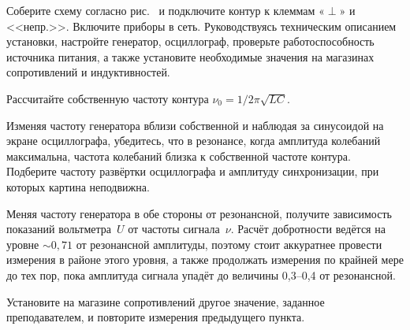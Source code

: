 \begin{lab:task}

    

	\item Соберите схему согласно рис.~
	и подключите контур к клеммам «$\perp$» и <<непр.>>. Включите приборы в сеть. 
    Руководствуясь техническим описанием установки, настройте генератор, 
    осциллограф, проверьте работоспособность источника питания, 
    а также установите необходимые значения на магазинах сопротивлений 
    и индуктивностей.


	\item Рассчитайте собственную частоту контура $\nu_{0} = 1/2\pi\sqrt{LC}$.

	\item Изменяя частоту генератора вблизи собственной и наблюдая за синусоидой 
    на экране осциллографа, убедитесь, что в резонансе, когда амплитуда колебаний 
    максимальна, частота колебаний близка к собственной частоте контура. 
    Подберите частоту развёртки осциллографа и амплитуду синхронизации, 
    при которых картина неподвижна.

	\item Меняя частоту генератора в обе стороны от резонансной, получите зависимость 
    показаний вольтметра~$U$ от частоты сигнала~$\nu$. 
    Расчёт добротности ведётся на уровне $\sim 0,71$ от резонансной амплитуды, 
    поэтому стоит аккуратнее провести измерения в районе этого уровня, 
    а также продолжать измерения по крайней мере до тех пор, пока амплитуда 
    сигнала упадёт до величины 0,3--0,4 от резонансной.

	\item Установите на магазине сопротивлений другое значение, заданное
преподавателем, и повторите измерения предыдущего пункта. 



\end{lab:task}
